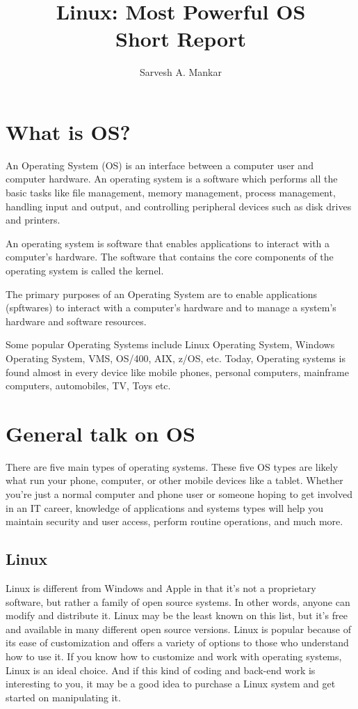 \documentclass[12pt]{article}
\title{Linux: Most Powerful OS \\ Short Report}
\author{Sarvesh A. Mankar}
\begin{document}
\maketitle
\thispagestyle{empty}
\tableofcontents %


\section{What is OS?}
An Operating System (OS) is an interface between a computer user and computer hardware. An operating system is a software which performs all the basic tasks like file management, memory management, process management, handling input and output, and controlling peripheral devices such as disk drives and printers.

An operating system is software that enables applications to interact with a computer's hardware. The software that contains the core components of the operating system is called the kernel.

The primary purposes of an Operating System are to enable applications (spftwares) to interact with a computer's hardware and to manage a system's hardware and software resources.

Some popular Operating Systems include Linux Operating System, Windows Operating System, VMS, OS/400, AIX, z/OS, etc. Today, Operating systems is found almost in every device like mobile phones, personal computers, mainframe computers, automobiles, TV, Toys etc.

\section{General talk on OS}

There are five main types of operating systems. These five OS types are likely what run your phone, computer, or other mobile devices like a tablet. Whether you’re just a normal computer and phone user or someone hoping to get involved in an IT career, knowledge of applications and systems types will help you maintain security and user access, perform routine operations, and much more.

\subsection{Linux}
Linux is different from Windows and Apple in that it’s not a proprietary software, but rather a family of open source systems. In other words, anyone can modify and distribute it. Linux may be the least known on this list, but it’s free and available in many different open source versions. Linux is popular because of its ease of customization and offers a variety of options to those who understand how to use it. If you know how to customize and work with operating systems, Linux is an ideal choice. And if this kind of coding and back-end work is interesting to you, it may be a good idea to purchase a Linux system and get started on manipulating it.
\end{document}
